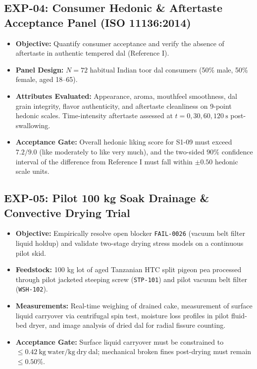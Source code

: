 \documentclass[10pt,a4paper]{article}
\begin{document}
\subsection{EXP-04: Consumer Hedonic \& Aftertaste Acceptance Panel (ISO 11136:2014)}
\begin{itemize}[leftmargin=1.5em]
    \item \textbf{Objective:} Quantify consumer acceptance and verify the absence of aftertaste in authentic tempered dal (Reference I).
    \item \textbf{Panel Design:} $N = 72$ habitual Indian toor dal consumers (50\% male, 50\% female, aged 18--65).
    \item \textbf{Attributes Evaluated:} Appearance, aroma, mouthfeel smoothness, dal grain integrity, flavor authenticity, and aftertaste cleanliness on 9-point hedonic scales. Time-intensity aftertaste assessed at $t = 0, 30, 60, 120\ \mathrm{s}$ post-swallowing.
    \item \textbf{Acceptance Gate:} Overall hedonic liking score for S1-09 must exceed $7.2 / 9.0$ (like moderately to like very much), and the two-sided $90\%$ confidence interval of the difference from Reference I must fall within $\pm 0.50$ hedonic scale units.
\end{itemize}

\subsection{EXP-05: Pilot 100 kg Soak Drainage \& Convective Drying Trial}
\begin{itemize}[leftmargin=1.5em]
    \item \textbf{Objective:} Empirically resolve open blocker \texttt{FAIL-0026} (vacuum belt filter liquid holdup) and validate two-stage drying stress models on a continuous pilot skid.
    \item \textbf{Feedstock:} 100 kg lot of aged Tanzanian HTC split pigeon pea processed through pilot jacketed steeping screw (\texttt{STP-101}) and pilot vacuum belt filter (\texttt{WSH-102}).
    \item \textbf{Measurements:} Real-time weighing of drained cake, measurement of surface liquid carryover via centrifugal spin test, moisture loss profiles in pilot fluid-bed dryer, and image analysis of dried dal for radial fissure counting.
    \item \textbf{Acceptance Gate:} Surface liquid carryover must be constrained to $\le 0.42\ \mathrm{kg\ water/kg\ dry\ dal}$; mechanical broken fines post-drying must remain $\le 0.50\%$.
\end{itemize}
\end{document}
